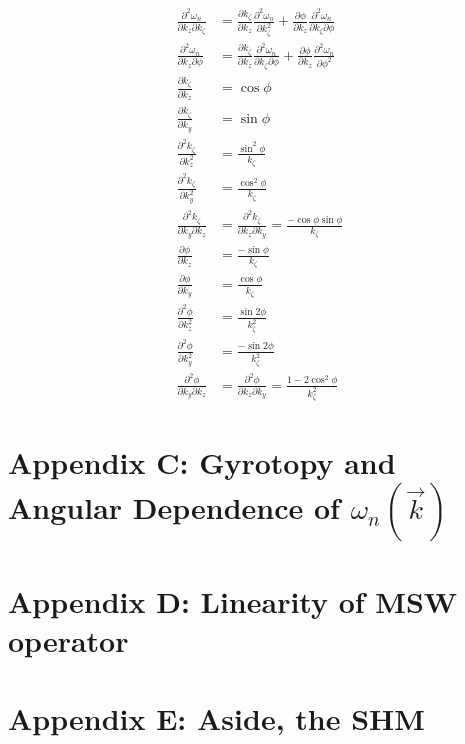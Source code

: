 \documentclass{article}
\begin{document}
\begin{align}
\frac{\partial^2 \omega_{n}}{\partial k_{z} \partial k_{\zeta}} &= \frac{\partial k_{\zeta}}{\partial k_{z}} \frac{\partial^2 \omega_{n}}{\partial k_{\zeta}^2} + \frac{\partial \phi}{\partial k_{z}} \frac{\partial^2 \omega_{n}}{\partial k_{\zeta} \partial \phi} \\
\frac{\partial^2 \omega_{n}}{\partial k_{z} \partial \phi} &= \frac{\partial k_{\zeta}}{\partial k_{z}} \frac{\partial^2 \omega_{n}}{\partial k_{\zeta} \partial \phi} + \frac{\partial \phi}{\partial k_{z}} \frac{\partial^2 \omega_{n}}{\partial \phi^2} \\
\frac{\partial k_{\zeta}}{\partial k_{z}} &= \cos{\phi} \\
\frac{\partial k_{\zeta}}{\partial k_{y}} &= \sin{\phi} \\
\frac{\partial^2 k_{\zeta}}{\partial k_{z}^2} &= \frac{\sin^2{\phi}}{k_{\zeta}} \\
\frac{\partial^2 k_{\zeta}}{\partial k_{y}^2} &= \frac{\cos^2{\phi}}{k_{\zeta}} \\
\frac{\partial^2 k_{\zeta}}{\partial k_{y} \partial k_{z}} &= \frac{\partial^2 k_{\zeta}}{\partial k_{z} \partial k_{y}} = \frac{-\cos{\phi} \sin{\phi}}{k_{\zeta}} \\
\frac{\partial \phi}{\partial k_{z}} &= \frac{- \sin{\phi}}{k_{\zeta}} \\
\frac{\partial \phi}{\partial k_{y}} &= \frac{\cos{\phi}}{k_{\zeta}} \\
\frac{\partial^2 \phi}{\partial k_{z}^2} &= \frac{\sin{2 \phi}}{k_{\zeta}^2} \\
\frac{\partial^2 \phi}{\partial k_{y}^2} &= \frac{-\sin{2 \phi}}{k_{\zeta}^2} \\
\frac{\partial^2 \phi}{\partial k_{y} \partial k_{z}} &= \frac{\partial^2 \phi}{\partial k_{z} \partial k_{y}} = \frac{1 - 2\cos^2{\phi}}{k_{\zeta}^2}
\end{align}

\section{Appendix C: Gyrotopy and Angular Dependence of $\omega_{n} (\vec{k})$}

\section{Appendix D: Linearity of MSW operator}

\section{Appendix E: Aside, the SHM}
\end{document}
